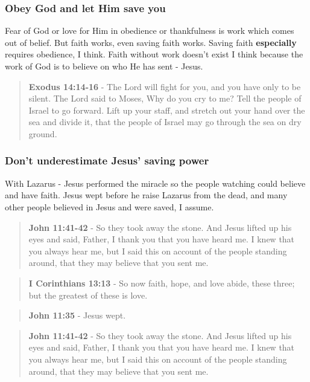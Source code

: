 \documentclass[11pt]{article}
\begin{document}
\subsubsection{Obey God and let Him save you}
\label{sec:orge0cba14}

Fear of God or love for Him in obedience or thankfulness is work which comes out of belief.
But faith works, even saving faith works. Saving faith \textbf{especially} requires obedience, I think.
Faith without work doesn't exist I think because the work of God is to believe on who He has sent - Jesus.

\begin{quote}
\textbf{Exodus 14:14-16} - The Lord will fight for you, and you have only to be silent.  The Lord said to Moses, Why do you cry to me? Tell the people of Israel to go forward.  Lift up your staff, and stretch out your hand over the sea and divide it, that the people of Israel may go through the sea on dry ground.
\end{quote}

\subsubsection{Don't underestimate Jesus' saving power}
\label{sec:orgcb62ba5}

With Lazarus - Jesus performed the miracle so the people watching could believe and have faith.
Jesus wept before he raise Lazarus from the dead, and many other people believed in Jesus and were saved, I assume.

\begin{quote}
\textbf{John 11:41-42} - So they took away the stone. And Jesus lifted up his eyes and said, Father, I thank you that you have heard me. I knew that you always hear me, but I said this on account of the people standing around, that they may believe that you sent me.
\end{quote}

\begin{quote}
\textbf{I Corinthians 13:13} - So now faith, hope, and love abide, these three; but the greatest of these is love.
\end{quote}

\begin{quote}
\textbf{John 11:35} - Jesus wept.
\end{quote}

\begin{quote}
\textbf{John 11:41-42} - So they took away the stone. And Jesus lifted up his eyes and said, Father, I thank you that you have heard me. I knew that you always hear me, but I said this on account of the people standing around, that they may believe that you sent me.
\end{quote}
\end{document}
